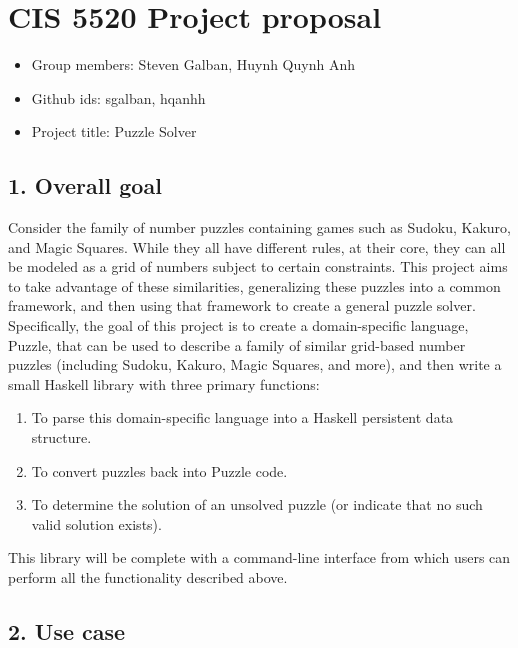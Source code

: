 \documentclass[
]{article}
\date{}
\begin{document}
	
	\hypertarget{cis-5520-project-proposal}{%
		\section{CIS 5520 Project proposal}\label{cis-5520-project-proposal}}
	
	\begin{itemize}
		\item
		Group members:
		Steven Galban, Huynh Quynh Anh
		\item
		Github ids:
		sgalban, hqanhh
		\item
		Project title: Puzzle Solver
	\end{itemize}
	
	\hypertarget{overall-goal}{%
		\subsection{1. Overall goal}\label{overall-goal}}
	
	Consider the family of number puzzles containing games such as Sudoku, Kakuro, and Magic Squares. While they all have different rules, at their core, they can all be modeled as a grid of numbers subject to certain constraints. This project aims to take advantage of these similarities, generalizing these puzzles into a common framework, and then using that framework to create a general puzzle solver.
	Specifically, the goal of this project is to create a domain-specific language, Puzzle, that can be used to describe a family of similar grid-based number puzzles (including Sudoku, Kakuro, Magic Squares, and more), and then write a small Haskell library with three primary functions: \begin{enumerate}
		\item To parse this domain-specific language into a Haskell persistent data structure.
		\item To convert puzzles back into Puzzle code.
		\item To determine the solution of an unsolved puzzle (or indicate that no such valid solution exists).
	\end{enumerate} 
	This library will be complete with a command-line interface from which users can perform all the functionality described above.
	
	\hypertarget{use-case}{%
		\subsection{2. Use case}\label{use-case}}
	
\end{document}
